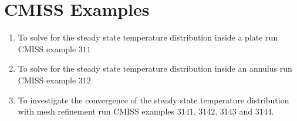 
\section{CMISS Examples}

\begin{enumerate}
\item  To solve for the steady state temperature distribution inside  a plate run CMISS example $311$ 
\item   To solve for the steady state temperature distribution inside  
an annulus run CMISS example $312$
 \item   To investigate the convergence of the steady state temperature
   distribution with mesh refinement  run CMISS examples $3141$, $3142$, $3143$
   and $3144$.
\end{enumerate}



